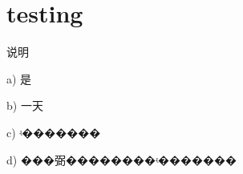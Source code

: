 \documentclass[a4paper,12pt]{ctexbook}	%
\begin{document}
\section{testing}


说明

a) 是

b) 一天

c) ʵ�������

d) ���弼��������ʵ�������


\end{document}
